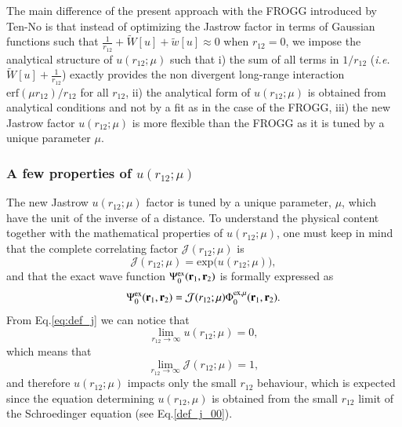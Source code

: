 \documentclass[aip,jcp,reprint,noshowkeys,superscriptaddress]{revtex4-1}
\newcommand{\br}[0]{{\bf {r}}}
\newcommand{\psiex}[0]{\Psi^{\text{ex}}_0}
\newcommand{\phimu}[0]{\Phi^{\text{ex},\mu}_0}
\begin{document}
The main difference of the present approach with the FROGG introduced by Ten-No\cite{TenNo-CPL-00-a} is that instead of optimizing the Jastrow factor in terms of Gaussian functions such that $\frac{1}{r_{12}}  + \tilde{W}[u] + \tilde{w}[u] \approx 0$ when $r_{12}=0$, 
we impose the analytical structure of $u(r_{12};\mu)$ such that i) the sum of all terms in $1/r_{12}$ (\textit{i.e.} $\tilde{W}[u] + \frac{1}{r_{12}}$) exactly provides the non divergent long-range interaction $\text{erf}(\mu r_{12})/r_{12}$ for all $r_{12}$, 
ii) the analytical form of $u(r_{12};\mu)$ is obtained from analytical conditions and not by a fit as in the case of the FROGG,  
iii) the new Jastrow factor $u(r_{12};\mu)$ is more flexible than the FROGG as it is tuned by a unique parameter $\mu$.  

\subsubsection{A few properties of $u(r_{12};\mu)$}
The new Jastrow $u(r_{12};\mu)$ factor is tuned by a unique parameter, $\mu$, which have the unit of the inverse of a distance. 
To understand the physical content together with the mathematical properties of $u(r_{12};\mu)$, 
one must keep in mind that the complete correlating factor $\mathcal{J}(r_{12};\mu)$ is 
\begin{equation}
 \mathcal{J}(r_{12};\mu) = \text{exp}\big(u(r_{12};\mu)\big),
\end{equation}
and that the exact wave function $\psiex(\br{}_1,\br{}_2)$ is formally expressed as 
\begin{equation}
 \psiex(\br{}_1,\br{}_2) = \mathcal{J}(r_{12};\mu) \phimu(\br{}_{1},\br{}_{2}).  
\end{equation}
From Eq.\eqref{eq:def_j} we can notice that 
\begin{equation}
 \lim_{r_{12} \rightarrow \infty}u(r_{12};\mu) = 0,
\end{equation}
which means that 
\begin{equation}
 \lim_{r_{12} \rightarrow \infty}\mathcal{J}(r_{12};\mu) = 1,
\end{equation}
and therefore $u(r_{12};\mu)$ impacts only the small $r_{12}$ behaviour,  
which is expected since the equation determining $u(r_{12},\mu)$ is obtained from the small $r_{12}$ limit of the Schroedinger equation (see Eq.\eqref{def_j_00}). 
\end{document}

